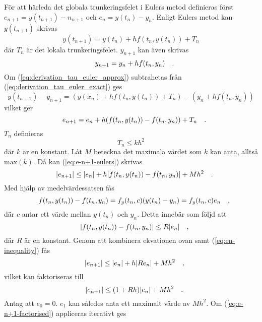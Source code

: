 För att härleda det globala trunkeringsfelet i Eulers metod definieras först \(e_{n+1}=y(t_{n+1})-n_{n+1}\) och \(e_n=y({t_n})-y_n\). Enligt Eulers metod kan \(y(t_{n+1})\)
skrivas
\begin{equation}\label{eq:derivation_tau_euler_exact}
    y(t_{n+1})=y(t_n)+hf(t_n, y(t_n))+T_n
\end{equation} där \(T_n\) är det lokala trunkeringsfelet. \(y_{n+1}\) kan även skrivas
\begin{equation}\label{eq:derivation_tau_euler_approx}
    y_{n+1}=y_n+hf(t_n, y_n)
\quad\mathrm{.}\!\!\!\!\!\!\end{equation} Om (\ref{eq:derivation_tau_euler_approx}) subtrahetas från (\ref{eq:derivation_tau_euler_exact}) ges
\begin{equation}
    y(t_{n+1})-y_{n+1}=(y(x_n)+hf(t_n, y(t_n))+T_n)-(y_n+hf(t_n, y_n))
\end{equation}
vilket ger
\begin{equation}\label{eq:e-n+1-eulers}
    e_{n+1}=e_n+h(f(t_n, y(t_n))-f(t_n, y_n))+T_n
\quad\mathrm{.}\!\!\!\!\!\!\end{equation} \(T_n\) definieras
\begin{equation}
    T_n\leq kh^2
\end{equation} där \(k\) är en konstant. Låt \(M\) beteckna det maximala värdet som \(k\) kan anta, alltså \(\mathrm{max}(k)\). Då kan (\ref{eq:e-n+1-eulers}) skrivas
\begin{equation}\label{eq:en-inequality}
    |e_{n+1}|\leq |e_n|+h|f(t_n, y(t_n))-f(t_n, y_n)|+Mh^2
\quad\mathrm{.}\!\!\!\!\!\!\end{equation} Med hjälp av medelvärdessatsen fås
\begin{equation}
    f(t_n, y(t_n))-f(t_n, y_n)=f_y(t_n, c)(y(t_n)-y_n)=f_y(t_n, c)e_n
\quad\mathrm{,}\!\!\!\!\!\!\end{equation} där \(c\) antar ett värde mellan \(y(t_n)\) och  \(y_n\). Detta innebär som följd att
\begin{equation}
    |f(t_n, y(t_n))-f(t_n, y_n)|\leq R|e_n|
\quad\mathrm{,}\!\!\!\!\!\!\end{equation} där \(R\) är en konstant. Genom att kombinera ekvationen ovan samt (\ref{eq:en-inequality}) fås
\begin{equation}\label{eq:e-n+1-factorised}
        |e_{n+1}|\leq |e_n|+h|Re_n|+Mh^2
\quad\mathrm{,}\!\!\!\!\!\!\end{equation} vilket kan faktoriseras till
\begin{equation}
    |e_{n+1}|\leq (1+Rh)|e_n|+Mh^2
\quad\mathrm{.}\!\!\!\!\!\!\end{equation} Antag att \(e_0=0\). \(e_1\) kan således anta ett maximalt värde av \(Mh^2\). Om (\ref{eq:e-n+1-factorised}) appliceras iterativt ges
